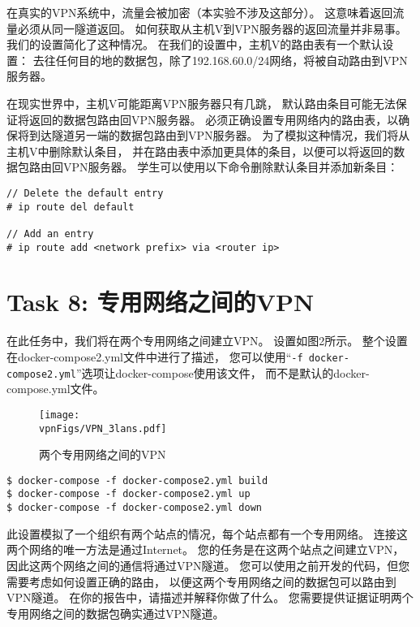 在真实的VPN系统中，流量会被加密（本实验不涉及这部分）。
这意味着返回流量必须从同一隧道返回。
如何获取从主机V到VPN服务器的返回流量并非易事。
我们的设置简化了这种情况。
在我们的设置中，主机V的路由表有一个默认设置：
去往任何目的地的数据包，除了192.168.60.0/24网络，将被自动路由到VPN服务器。

在现实世界中，主机V可能距离VPN服务器只有几跳，
默认路由条目可能无法保证将返回的数据包路由回VPN服务器。
必须正确设置专用网络内的路由表，以确保将到达隧道另一端的数据包路由到VPN服务器。
为了模拟这种情况，我们将从主机V中删除默认条目，
并在路由表中添加更具体的条目，以便可以将返回的数据包路由回VPN服务器。
学生可以使用以下命令删除默认条目并添加新条目：

\begin{lstlisting}
// Delete the default entry
# ip route del default

// Add an entry
# ip route add <network prefix> via <router ip>
\end{lstlisting}


\section{Task 8: 专用网络之间的VPN} 

在此任务中，我们将在两个专用网络之间建立VPN。 
设置如图2所示。
整个设置在docker-compose2.yml文件中进行了描述，
您可以使用“\verb|-f docker-compose2.yml|”选项让docker-compose使用该文件，
而不是默认的docker-compose.yml文件。

\begin{figure}[htb]
  \begin{center}
    \texttt{[image: \\vpnFigs/VPN\_3lans.pdf]}
  \end{center}
  \caption{两个专用网络之间的VPN}
  \label{vpn:fig:vpn-2pn}
\end{figure}

\begin{lstlisting}
$ docker-compose -f docker-compose2.yml build
$ docker-compose -f docker-compose2.yml up
$ docker-compose -f docker-compose2.yml down
\end{lstlisting}

此设置模拟了一个组织有两个站点的情况，每个站点都有一个专用网络。 
连接这两个网络的唯一方法是通过Internet。 
您的任务是在这两个站点之间建立VPN，因此这两个网络之间的通信将通过VPN隧道。 
您可以使用之前开发的代码，但您需要考虑如何设置正确的路由，
以便这两个专用网络之间的数据包可以路由到VPN隧道。 
在你的报告中，请描述并解释你做了什么。 
您需要提供证据证明两个专用网络之间的数据包确实通过VPN隧道。


